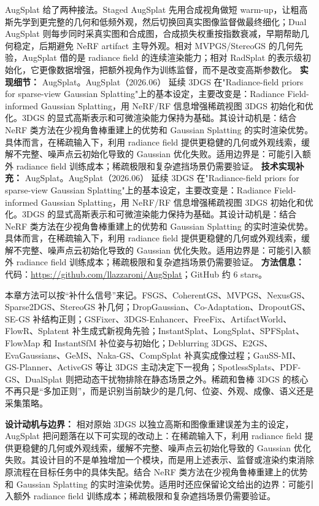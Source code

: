 AugSplat 给了两种接法。Staged AugSplat 先用合成视角做短 warm-up，让粗高斯先学到更完整的几何和低频外观，然后切换回真实图像监督做最终细化；Dual AugSplat 则每步同时采真实图和合成图，合成损失权重按指数衰减，早期帮助几何稳定，后期避免 NeRF artifact 主导外观。相对 MVPGS/StereoGS 的几何先验，AugSplat 借的是 radiance field 的连续渲染能力；相对 RadSplat 的表示级初始化，它更像数据增强，把额外视角作为训练监督，而不是改变高斯参数化。
\textbf{实现细节：} AugSplat。AugSplat（2026.06） 延续 3DGS 在"Radiance-field priors for sparse-view Gaussian Splatting"上的基本设定，主要改变是：Radiance Field-informed Gaussian Splatting，用 NeRF/RF 信息增强稀疏视图 3DGS 初始化和优化。3DGS 的显式高斯表示和可微渲染能力保持为基础。其设计动机是：结合 NeRF 类方法在少视角鲁棒重建上的优势和 Gaussian Splatting 的实时渲染优势。具体而言，在稀疏输入下，利用 radiance field 提供更稳健的几何或外观线索，缓解不完整、噪声点云初始化导致的 Gaussian 优化失败。适用边界是：可能引入额外 radiance field 训练成本；稀疏极限和复杂遮挡场景仍需要验证。
\textbf{技术实现补充：} AugSplat。AugSplat（2026.06） 延续 3DGS 在"Radiance-field priors for sparse-view Gaussian Splatting"上的基本设定，主要改变是：Radiance Field-informed Gaussian Splatting，用 NeRF/RF 信息增强稀疏视图 3DGS 初始化和优化。3DGS 的显式高斯表示和可微渲染能力保持为基础。其设计动机是：结合 NeRF 类方法在少视角鲁棒重建上的优势和 Gaussian Splatting 的实时渲染优势。具体而言，在稀疏输入下，利用 radiance field 提供更稳健的几何或外观线索，缓解不完整、噪声点云初始化导致的 Gaussian 优化失败。适用边界是：可能引入额外 radiance field 训练成本；稀疏极限和复杂遮挡场景仍需要验证。
\textbf{方法信息：} 代码：\url{https://github.com/llazzaroni/AugSplat}；GitHub 约 6 stars。

\begin{takeaway}
本章方法可以按“补什么信号”来记。FSGS、CoherentGS、MVPGS、NexusGS、Sparse2DGS、StereoGS 补几何；DropGaussian、Co-Adaptation、DropoutGS、SE-GS 补结构正则；GSFixer、3DGS-Enhancer、FreeFix、ArtifactWorld、FlowR、Splatent 补生成式新视角先验；InstantSplat、LongSplat、SPFSplat、FlowMap 和 InstantSfM 补位姿与初始化；Deblurring 3DGS、E2GS、EvaGaussians、GeMS、Naka-GS、CompSplat 补真实成像过程；GauSS-MI、GS-Planner、ActiveGS 等让 3DGS 主动决定下一视角；SpotlessSplats、PDF-GS、DualSplat 则把动态干扰物排除在静态场景之外。稀疏和鲁棒 3DGS 的核心不再只是“多加正则”，而是识别当前缺少的是几何、位姿、外观、成像、语义还是采集策略。
\end{takeaway}
\textbf{设计动机与边界：} 相对原始 3DGS 以独立高斯和图像重建误差为主的设定，AugSplat 把问题落在以下可实现的改动上：在稀疏输入下，利用 radiance field 提供更稳健的几何或外观线索，缓解不完整、噪声点云初始化导致的 Gaussian 优化失败。其设计目的不是单独增加一个模块，而是用上述表示、监督或渲染约束消除原流程在目标任务中的具体失配。结合 NeRF 类方法在少视角鲁棒重建上的优势和 Gaussian Splatting 的实时渲染优势。适用时还应保留论文给出的边界：可能引入额外 radiance field 训练成本；稀疏极限和复杂遮挡场景仍需要验证。

